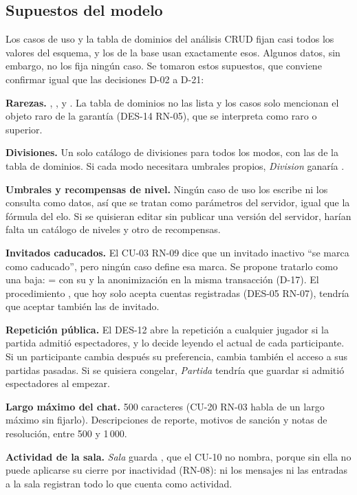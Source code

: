 \subsection*{Supuestos del modelo}

Los casos de uso y la tabla de dominios del análisis CRUD fijan casi todos los valores del esquema, y los  de la base usan exactamente esos. Algunos datos, sin embargo, no los fija ningún caso. Se tomaron estos supuestos, que conviene confirmar igual que las decisiones \mbox{D-02} a \mbox{D-21}:

\begin{reglas}
  \item \textbf{Rarezas.} , ,  y . La tabla de dominios no las lista y los casos solo mencionan el objeto raro de la garantía (\mbox{DES-14} \mbox{RN-05}), que se interpreta como raro o superior.
  \item \textbf{Divisiones.} Un solo catálogo de divisiones para todos los modos, con las de la tabla de dominios. Si cada modo necesitara umbrales propios, \textit{Division} ganaría .
  \item \textbf{Umbrales y recompensas de nivel.} Ningún caso de uso los escribe ni los consulta como datos, así que se tratan como parámetros del servidor, igual que la fórmula del elo. Si se quisieran editar sin publicar una versión del servidor, harían falta un catálogo de niveles y otro de recompensas.
  \item \textbf{Invitados caducados.} El \mbox{CU-03} \mbox{RN-09} dice que un invitado inactivo ``se marca como caducado'', pero ningún caso define esa marca. Se propone tratarlo como una baja:  =  con su  y la anonimización en la misma transacción (\mbox{D-17}). El procedimiento , que hoy solo acepta cuentas registradas (\mbox{DES-05} \mbox{RN-07}), tendría que aceptar también las de invitado.
  \item \textbf{Repetición pública.} El \mbox{DES-12} abre la repetición a cualquier jugador si la partida admitió espectadores, y lo decide leyendo el  actual de cada participante. Si un participante cambia después su preferencia, cambia también el acceso a sus partidas pasadas. Si se quisiera congelar, \textit{Partida} tendría que guardar si admitió espectadores al empezar.
  \item \textbf{Largo máximo del chat.} 500 caracteres (\mbox{CU-20} \mbox{RN-03} habla de un largo máximo sin fijarlo). Descripciones de reporte, motivos de sanción y notas de resolución, entre 500 y 1\,000.
  \item \textbf{Actividad de la sala.} \textit{Sala} guarda , que el \mbox{CU-10} no nombra, porque sin ella no puede aplicarse su cierre por inactividad (\mbox{RN-08}): ni los mensajes ni las entradas a la sala registran todo lo que cuenta como actividad.
\end{reglas}
